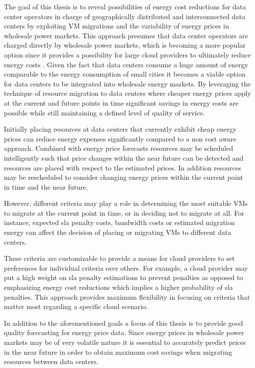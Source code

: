 The goal of this thesis is to reveal possibilities of energy cost reductions for data center operators in charge of geographically distributed and interconnected data centers by exploiting VM migrations and the variability of energy prices in wholesale power markets. This approach presumes that data center operators are charged directly by wholesale power markets, which is becoming a more popular option since it provides a possibility for large cloud providers to ultimately reduce energy costs \cite{dcw2013optimizing}. 
Given the fact that data centers consume a huge amount of energy comparable to the energy consumption of small cities\cite{qureshi2009cutting} it becomes a viable option for data centers to be integrated into wholesale energy markets. By leveraging the technique of resource migration to data centers where cheaper energy prices apply at the current and future points in time significant savings in energy costs are possible while still maintaining a defined level of quality of service. 

Initially placing resources at data centers that currently exhibit cheap energy prices can reduce energy expenses significantly compared to a non cost aware approach. Combined with energy price forecasts resources may be scheduled intelligently such that price changes within the near future can be detected and resources are placed with respect to the estimated prices. In addition resources may be rescheduled to consider changing energy prices within the current point in time and the near future. 
 
However, different criteria may play a role in determining the most suitable VMs to migrate at the current point in time, or in deciding not to migrate at all. For instance, expected sla penalty costs, bandwidth costs or estimated migration energy can affect the decision of placing or migrating VMs to different data centers. 

These criteria are customizable to provide a means for cloud providers to set preferences for individual criteria over others. For example, a cloud provider may put a high weight on sla penalty estimations to prevent penalties as opposed to emphasizing energy cost reductions which implies a higher probability of sla penalties. 
This approach provides maximum flexibility in focusing on criteria that matter most regarding a specific cloud scenario. 

In addition to the aforementioned goals a focus of this thesis is to provide good quality forecasting for energy price data. Since energy prices in wholesale power markets may be of very volatile nature it is essential to accurately predict prices in the near future in order to obtain maximum cost savings when migrating resources between data centers. 



